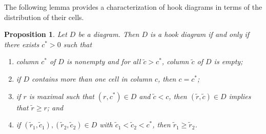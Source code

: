 \documentclass[letterpaper,10pt]{article}
\newtheorem{prop}[theorem]{Proposition}
\begin{document}
The following lemma provides a characterization of hook diagrams in terms of the distribution of their cells.

\begin{prop}\label{prop:formhook}
    Let $D$ be a diagram. Then $D$ is a hook diagram if and only if there exists $c^*>0$ such that
\begin{enumerate}
    \item[\textup{(i)}] column $c^*$ of $D$ is nonempty and for all $\tilde{c}>c^*$, column $\tilde{c}$ of $D$ is empty;
    \item[\textup{(ii)}] if $D$ contains more than one cell in column $c$, then $c=c^*$;
    \item[\textup{(iii)}] if $r$ is maximal such that $(r,c^*)\in D$ and $\tilde{c}<c$, then $(\tilde{r},\tilde{c})\in D$ implies that $\tilde{r}\ge r$; and
    \item[\textup{(iv)}] if $(\tilde{r}_1,\tilde{c}_1),(\tilde{r}_2,\tilde{c}_2)\in D$ with $\tilde{c}_1<\tilde{c}_2<c^*$, then $\tilde{r}_1\ge \tilde{r}_2$.
\end{enumerate}
\end{prop}
\end{document}

